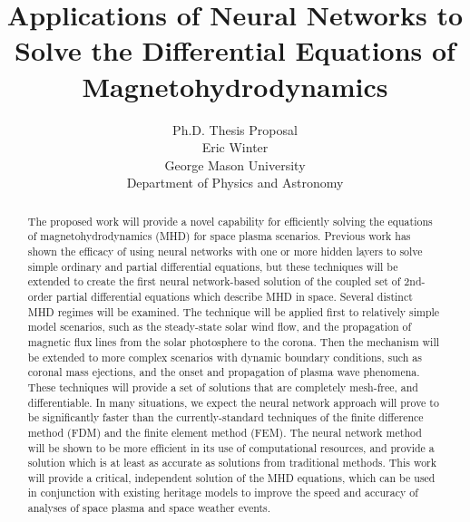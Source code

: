 \documentclass{article}
\title{Applications of Neural Networks to Solve the Differential Equations of Magnetohydrodynamics}
\author{Ph.D. Thesis Proposal\\Eric Winter\\George Mason University\\Department of Physics and Astronomy}
\begin{document}
\begin{titlepage}
\maketitle
\end{titlepage}


\begin{abstract}

The proposed work will provide a novel capability for efficiently solving the equations of magnetohydrodynamics (MHD) for space plasma scenarios. Previous work has shown the efficacy of using neural networks with one or more hidden layers to solve simple ordinary and partial differential equations, but these techniques will be extended to create the first neural network-based solution of the coupled set of 2nd-order partial differential equations which describe MHD in space. Several distinct MHD regimes will be examined. The technique will be applied first to relatively simple model scenarios, such as the steady-state solar wind flow, and the propagation of magnetic flux lines from the solar photosphere to the corona. Then the mechanism will be extended to more complex scenarios with dynamic boundary conditions, such as coronal mass ejections, and the onset and propagation of plasma wave phenomena. These techniques will provide a set of solutions that are completely mesh-free, and differentiable. In many situations, we expect the neural network approach will prove to be significantly faster than the currently-standard techniques of the finite difference method (FDM) and the finite element method (FEM). The neural network method will be shown to be more efficient in its use of computational resources, and provide a solution which is at least as accurate as solutions from traditional methods. This work will provide a critical, independent solution of the MHD equations, which can be used in conjunction with existing heritage models to improve the speed and accuracy of analyses of space plasma and space weather events.

\end{abstract}


\newpage

\tableofcontents

\end{document}
